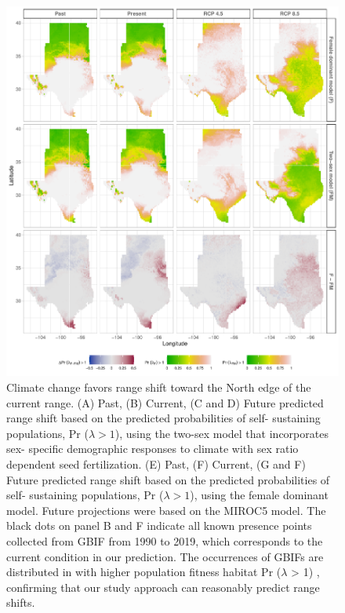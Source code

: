 \documentclass[12pt]{article}\usepackage[]{graphicx}\usepackage[dvipsnames]{xcolor}
\begin{document}
\begin{figure}[H]
	\begin{center}
		\includegraphics[width=0.95\linewidth]{Figures/Fig_geoPrlambda_miroc.pdf}
		\caption{Climate change favors range shift toward the North edge of the current range.
			(A) Past, (B) Current, (C and D) Future predicted range shift based on the predicted probabilities of self- sustaining populations, Pr ($\lambda > 1$), using the two-sex model that incorporates sex- specific demographic responses to climate with sex ratio dependent seed fertilization.
			(E) Past, (F) Current, (G and F) Future  predicted range shift based on the predicted probabilities of self- sustaining populations, Pr ($\lambda > 1$), using the female dominant model.
			Future projections were based on the MIROC5 model.
			The black dots on panel B and F indicate all known presence points collected from GBIF from 1990 to 2019, which corresponds to the current condition in our prediction. 
			The occurrences of GBIFs are distributed in with higher population fitness habitat Pr ($\lambda$ > 1) , confirming that our study approach can reasonably predict range shifts.}
		\label{Sup:geoprojmiroc}
	\end{center}
\end{figure}
\end{document}
